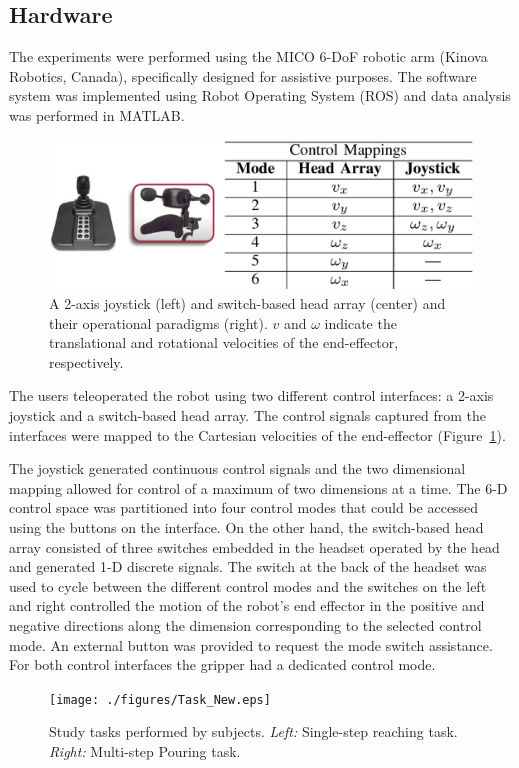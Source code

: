 \subsection{Hardware}\label{ssec:hardware}
The experiments were performed using the MICO 6-DoF robotic arm (Kinova Robotics, Canada), specifically designed for assistive purposes. The software system was implemented using Robot Operating System (ROS) and data analysis was performed in MATLAB. 
\begin{figure}[h]
	\centering
	\includegraphics[width = 1\hsize, height = 0.14\vsize]{./figures/INTER_4.eps}
	\caption{A 2-axis joystick (left) and switch-based head array (center) and their operational paradigms (right). $v$ and $\omega$ indicate the translational and rotational velocities of the end-effector, respectively.}
	\label{fig:interfaces}
\end{figure}
The users teleoperated the robot using two different control interfaces: a 2-axis joystick and a switch-based head array. The control signals captured from the interfaces were mapped to the Cartesian velocities of the end-effector (Figure~\ref{fig:interfaces}).

The joystick generated continuous control signals and the two dimensional mapping allowed for control of a maximum of two dimensions at a time. The 6-D control space was partitioned into four control modes that could be accessed using the buttons on the interface. On the other hand, the switch-based head array consisted of three switches embedded in the headset operated by the head and generated 1-D discrete signals. The switch at the back of the headset was used to cycle between the different control modes and the switches on the left and right controlled the motion of the robot's end effector in the positive and negative directions along the dimension corresponding to the selected control mode. An external button was provided to request the mode switch assistance. For both control interfaces the gripper had a dedicated control mode. 
\begin{figure}[ht!]
	\texttt{[image: ./figures/Task\_New.eps]}
	\caption{Study tasks performed by subjects. \textit{Left:} Single-step reaching task. \textit{Right:} Multi-step Pouring task. }
	\label{fig:tasks}
\end{figure}

